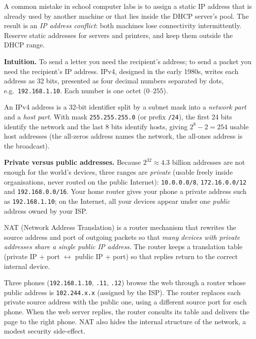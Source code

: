 \documentclass[11pt]{article}
\newcommand{\cle}[1]{{\popxbold\color{popdark}#1}}
\newcounter{popsec}
\newcounter{popsub}
\newcommand{\courssub}[1]{%
  \stepcounter{popsub}%
  \par\vspace{9pt}\noindent{\popxbold\fontsize{11.5}{13}\selectfont\color{popink}{\color{poporange}\thepopsec.\thepopsub}\hspace{6pt}#1}\par\nopagebreak\vspace{4pt}
}
\begin{document}
\begin{attention}
A common mistake in school computer labs is to assign a static IP address that is already used by another machine or that lies inside the DHCP server's pool. The result is an \emph{IP address conflict}: both machines lose connectivity intermittently. Reserve static addresses for servers and printers, and keep them outside the DHCP range.
\end{attention}

\courssub{IP Addressing: IPv4}

\textbf{Intuition.} To send a letter you need the recipient's address; to send a packet you need the recipient's \cle{IP address}. IPv4, designed in the early 1980s, writes each address as 32 bits, presented as four decimal numbers separated by dots, e.g.\ \texttt{192.168.1.10}. Each number is one octet ($0$--$255$).

\begin{definition}
An \cle{IPv4 address} is a 32-bit identifier split by a \cle{subnet mask} into a \emph{network part} and a \emph{host part}. With mask \texttt{255.255.255.0} (or prefix \texttt{/24}), the first 24 bits identify the network and the last 8 bits identify hosts, giving $2^8 - 2 = 254$ usable host addresses (the all-zeros address names the network, the all-ones address is the broadcast).
\end{definition}

\textbf{Private versus public addresses.} Because $2^{32} \approx 4.3$ billion addresses are not enough for the world's devices, three ranges are \emph{private} (usable freely inside organisations, never routed on the public Internet): \texttt{10.0.0.0/8}, \texttt{172.16.0.0/12} and \texttt{192.168.0.0/16}. Your home router gives your phone a private address such as \texttt{192.168.1.10}; on the Internet, all your devices appear under one \emph{public} address owned by your ISP.

\begin{definition}[NAT]
\cle{NAT} (Network Address Translation) is a router mechanism that rewrites the source address and port of outgoing packets so that \emph{many devices with private addresses share a single public IP address}. The router keeps a translation table (private IP + port $\leftrightarrow$ public IP + port) so that replies return to the correct internal device.
\end{definition}

\begin{exemplebox}
Three phones (\texttt{192.168.1.10}, \texttt{.11}, \texttt{.12}) browse the web through a router whose public address is \texttt{102.244.x.x} (assigned by the ISP). The router replaces each private source address with the public one, using a different source port for each phone. When the web server replies, the router consults its table and delivers the page to the right phone. NAT also hides the internal structure of the network, a modest security side-effect.
\end{exemplebox}
\end{document}
